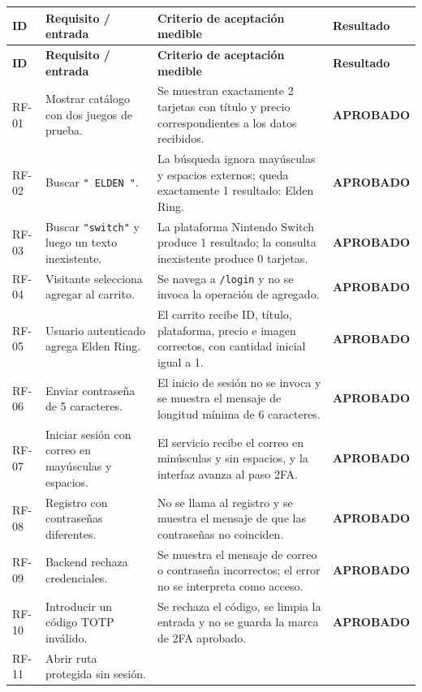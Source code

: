 \documentclass[11pt,letterpaper]{article}
\newcommand{\aprobado}{\textbf{APROBADO}}
\begin{document}
\small
\begin{longtable}{>{\raggedright\arraybackslash}p{1.5cm}
                  >{\raggedright\arraybackslash}p{3.1cm}
                  >{\raggedright\arraybackslash}p{7.6cm}
                  >{\raggedright\arraybackslash}p{2.5cm}}
\toprule
\textbf{ID} & \textbf{Requisito / entrada} & \textbf{Criterio de aceptación medible} &
\textbf{Resultado}\\
\midrule
\endfirsthead
\toprule
\textbf{ID} & \textbf{Requisito / entrada} & \textbf{Criterio de aceptación medible} &
\textbf{Resultado}\\
\midrule
\endhead
RF-01 & Mostrar catálogo con dos juegos de prueba. &
Se muestran exactamente 2 tarjetas con título y precio correspondientes a los datos recibidos. &
\aprobado{}\\
RF-02 & Buscar \texttt{"  ELDEN  "}. &
La búsqueda ignora mayúsculas y espacios externos; queda exactamente 1 resultado: Elden Ring. &
\aprobado{}\\
RF-03 & Buscar \texttt{"switch"} y luego un texto inexistente. &
La plataforma Nintendo Switch produce 1 resultado; la consulta inexistente produce 0 tarjetas. &
\aprobado{}\\
RF-04 & Visitante selecciona agregar al carrito. &
Se navega a \texttt{/login} y no se invoca la operación de agregado. &
\aprobado{}\\
RF-05 & Usuario autenticado agrega Elden Ring. &
El carrito recibe ID, título, plataforma, precio e imagen correctos, con cantidad inicial igual a 1. &
\aprobado{}\\
RF-06 & Enviar contraseña de 5 caracteres. &
El inicio de sesión no se invoca y se muestra el mensaje de longitud mínima de 6 caracteres. &
\aprobado{}\\
RF-07 & Iniciar sesión con correo en mayúsculas y espacios. &
El servicio recibe el correo en minúsculas y sin espacios, y la interfaz avanza al paso 2FA. &
\aprobado{}\\
RF-08 & Registro con contraseñas diferentes. &
No se llama al registro y se muestra el mensaje de que las contraseñas no coinciden. &
\aprobado{}\\
RF-09 & Backend rechaza credenciales. &
Se muestra el mensaje de correo o contraseña incorrectos; el error no se interpreta como acceso. &
\aprobado{}\\
RF-10 & Introducir un código TOTP inválido. &
Se rechaza el código, se limpia la entrada y no se guarda la marca de 2FA aprobado. &
\aprobado{}\\
RF-11 & Abrir ruta protegida sin sesión. &

\end{longtable}
\end{document}
